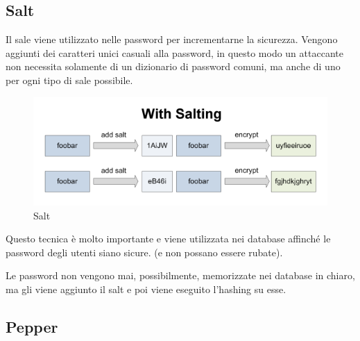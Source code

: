 

\subsection{Salt}

 

\textsf{\small  Il sale viene utilizzato nelle password per incrementarne la sicurezza. Vengono aggiunti dei caratteri unici casuali alla password, in questo modo un attaccante non necessita solamente di un dizionario di password comuni, ma anche di uno per ogni tipo di sale possibile.} %

\begin{figure}[H]
	\centering
	\includegraphics[width=1\textwidth, height=1\textheight, keepaspectratio]{./images/iv_nonce_salt_pepper/withsalting.png}
	\caption{Salt}
	\label{fig:salt}
\end{figure}

 

\textsf{\small Questo tecnica è molto importante e viene utilizzata nei database affinché le password degli utenti siano sicure. (e non possano essere rubate).} %

 

\textsf{\small Le password non vengono mai, possibilmente, memorizzate nei database in chiaro, ma gli viene aggiunto il salt e poi viene eseguito l'hashing su esse.}

\subsection{Pepper}

